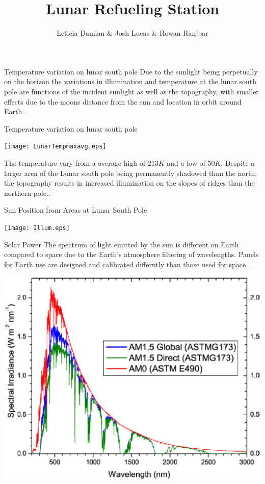 \documentclass{beamer}
\title{ Lunar Refueling Station}
\author{Leticia Damian \& Josh Lucas \& Rowan Ranjbar }
\institute[CSUSM] %
{
  \inst{1}%
  Dept. of Physics\\
  California State University San Marcos
}
\date %
\begin{document}
 
\frame{\titlepage}


\begin{frame}{Temperature variation on lunar south pole}
Due to the sunlight being perpetually on the horizon the variations in illumination and temperature at the lunar south pole are functions of the incident sunlight as well as the topography, with smaller effects due to the moons distance from the sun and location in orbit around Earth \cite{Williams}.
\end{frame}





\begin{frame}{Temperature variation on lunar south pole}
 \begin{center}
             \texttt{[image: LunarTempmaxavg.eps]}   
      \end{center}  
 The temperature vary from a average high of $213K $ and a low of $50K$.
 Despite a larger area of the Lunar south pole being permanently shadowed than the north, the topography results in increased illumination on the slopes of ridges than the northern pole.\cite{Williams}\cite{Hayne}.
\end{frame}


\begin{frame}{Sun Position from Areas at Lunar South Pole}


 \begin{center}
             \texttt{[image: Illum.eps]}   
      \end{center}  

\end{frame}
\begin{frame}{Solar Power}
The spectrum of light emitted by the sun is different on Earth compared to space due to the Earth's atmosphere filtering of  wavelengths. Panels for Earth use are designed and calibrated differntly than those used for space\cite{Liebert} \cite{Mcevoy}.  
 \begin{center}
             \includegraphics[width=.68\textwidth]{AM0.eps}   
      \end{center}  

\end{frame}
\end{document}
